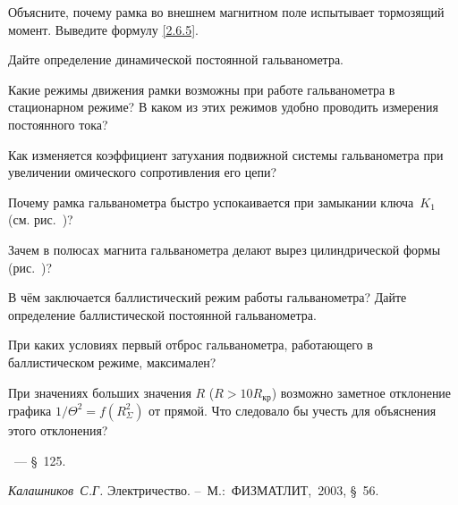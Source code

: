 \begin{lab:questions}
    \item Объясните, почему рамка во внешнем магнитном поле
    испытывает тормозящий момент. Выведите формулу \eqref{2.6.5}.
    
	\item Дайте определение динамической постоянной гальванометра. 

	\item Какие режимы движения рамки возможны при работе гальванометра в
стационарном режиме? В каком из этих режимов удобно проводить измерения
постоянного тока?

	\item Как изменяется коэффициент затухания подвижной системы гальванометра
при увеличении омического сопротивления его цепи?

	\item Почему рамка гальванометра быстро успокаивается при замыкании ключа~$K_1$ (см. рис.~)?

	\item Зачем в полюсах магнита гальванометра делают вырез цилиндрической
формы (рис.~)?

	\item В чём заключается баллистический режим работы гальванометра? Дайте
определение баллистической постоянной гальванометра.

	\item При каких условиях первый отброс гальванометра, работающего в
баллистическом режиме, максимален?

	\item При значениях больших значения $R$ ($R>10R_{\text{кр}}$)
возможно заметное отклонение графика $1/\Theta^2=f(R_{\Sigma}^2)$ от прямой. 
Что следовало бы учесть для объяснения этого отклонения?
\end{lab:questions}


\begin{lab:literature}
	\item \SivuhinIII~--- \S~125.

	\item \emph{Калашников~С.Г.} Электричество. --~М.:~ФИЗМАТЛИТ,~2003, \S~56.
\end{lab:literature}
